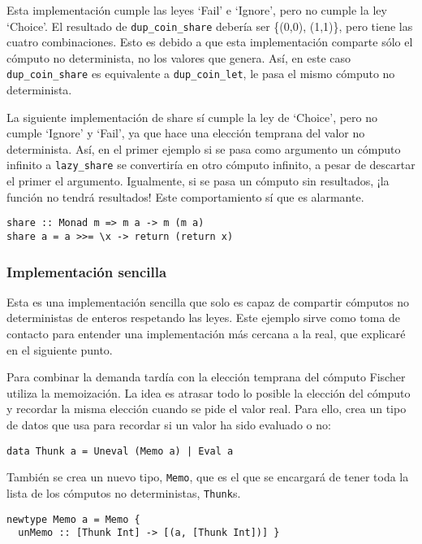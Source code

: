 \documentclass[class=article, crop=false]{standalone}
\begin{document}
Esta implementación cumple las leyes `Fail' e `Ignore', pero no cumple la ley `Choice'. El
resultado de \verb`dup_coin_share` debería ser \{(0,0), (1,1)\}, pero tiene las cuatro
combinaciones. Esto es debido a que esta implementación comparte sólo el cómputo no
determinista, no los valores que genera. Así, en este caso \verb`dup_coin_share` es
equivalente a \verb`dup_coin_let`, le pasa el mismo cómputo no determinista.

La siguiente implementación de share sí cumple la ley de `Choice', pero no cumple `Ignore' y
`Fail', ya que hace una elección temprana del valor no determinista. Así, en el primer
ejemplo si se pasa como argumento un cómputo infinito a \verb`lazy_share` se convertiría en
otro cómputo infinito, a pesar de descartar el primer el argumento. Igualmente, si se pasa un
cómputo sin resultados, ¡la función no tendrá resultados! Este comportamiento sí que es
alarmante.

\begin{verbatim} 
share :: Monad m => m a -> m (m a)
share a = a >>= \x -> return (return x)
\end{verbatim}

\subsubsection{Implementación sencilla}
Esta es una implementación sencilla que solo es capaz de compartir cómputos no deterministas
de enteros respetando las leyes. Este ejemplo sirve como toma de contacto para entender una
implementación más cercana a la real, que explicaré en el siguiente punto.

Para combinar la demanda tardía con la elección temprana del cómputo Fischer utiliza la
memoización. La idea es atrasar todo lo posible la elección del cómputo y recordar la misma
elección cuando se pide el valor real. Para ello, crea un tipo de datos que usa para recordar
si un valor ha sido evaluado o no:

\begin{verbatim} 
data Thunk a = Uneval (Memo a) | Eval a
\end{verbatim}

También se crea un nuevo tipo, \verb`Memo`, que es el que se encargará de tener toda la lista
de los cómputos no deterministas, \verb`Thunk`s.

\begin{verbatim} 
newtype Memo a = Memo {
  unMemo :: [Thunk Int] -> [(a, [Thunk Int])] }
\end{verbatim}
\end{document}
